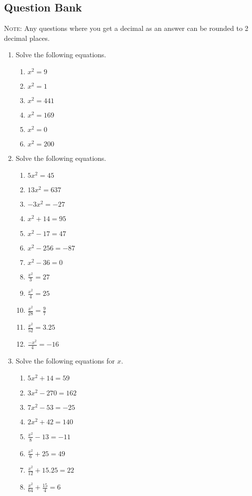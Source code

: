 \documentclass[a4paper,12pt]{article}
\begin{document}
\newpage
\subsection*{Question Bank}

\textsc{Note}: Any questions where you get a decimal as an answer
can be rounded to 2 decimal places.

\begin{enumerate}
\item Solve the following equations.
    \begin{multicols}{2}
    \begin{enumerate}
    \item $x^2 = 9$
    \item $x^2 = 1$
    \item $x^2 = 441$
    \item $x^2 = 169$
    \item $x^2 = 0$
    \item $x^2 = 200$
    \end{enumerate}
    \end{multicols}

\item Solve the following equations.
    \begin{multicols}{2}
    \begin{enumerate}
    \item $5x^2 = 45$
    \item $13x^2 = 637$
    \item $-3x^2 = -27$
    \item $x^2 + 14 = 95$
    \item $x^2 - 17 = 47$
    \item $x^2 - 256 = -87$
    \item $x^2 - 36 = 0$
    \item $\frac{x^2}{3} = 27$
    \item $\frac{x^2}{4} = 25$
    \item $\frac{x^2}{28} = \frac{9}{7}$
    \item $\frac{x^2}{52} = 3.25$
    \item $\frac{-x^2}{4} = -16$
    \end{enumerate}
    \end{multicols}

\item Solve the following equations for $x$.
    \begin{multicols}{2}
    \begin{enumerate}
    \item $5x^2 + 14 = 59$
    \item $3x^2 - 270 = 162$
    \item $7x^2 - 53 = -25$
    \item $2x^2 + 42 = 140$
    \item $ \frac{x^2}{8}-13 = -11$
    \item $ \frac{x^2}{6} + 25 = 49$
    \item $ \frac{x^2}{12} + 15.25 = 22$
    \item $ \frac{x^2}{64} + \frac{15}{4} = 6$
    \end{enumerate}
    \end{multicols}


\end{enumerate}
\end{document}
